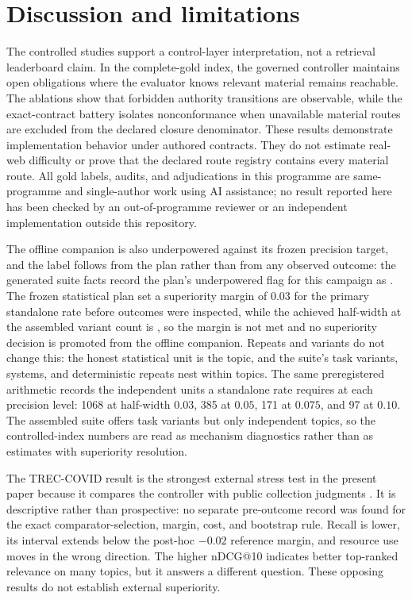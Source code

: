 \documentclass[a4paper,fleqn]{cas-sc}
\theoremstyle{definition}
\begin{document}
\section{Discussion and limitations}

The controlled studies support a control-layer interpretation, not a retrieval
leaderboard claim. In the complete-gold index, the governed controller maintains
open obligations where the evaluator knows relevant material remains reachable.
The ablations show that forbidden authority transitions are observable, while
the exact-contract battery isolates nonconformance when unavailable material
routes are excluded from the declared closure denominator. These results demonstrate implementation behavior
under authored contracts. They do not estimate real-web difficulty or prove
that the declared route registry contains every material route.  All gold labels, audits, and adjudications in this programme are same-programme and single-author work using AI assistance; no result reported here has been checked by an out-of-programme reviewer or an independent implementation outside this repository.

The offline companion is also underpowered against its frozen precision
target, and the label follows from the plan rather than from any observed
outcome: the generated suite facts record the plan's underpowered flag for this
campaign as \OfflineUnderpowered{}. The frozen statistical plan set a
superiority margin of $0.03$ for the primary standalone rate before outcomes
were inspected, while the achieved half-width at the assembled variant count is
\OfflineAchievedHalfWidth{}, so the margin is not met and no superiority
decision is promoted from the offline companion. Repeats and variants do not
change this: the honest statistical unit is the topic, and the suite's
\OfflineTaskCount{} task variants, \OfflineSystemCount{} systems, and
\OfflineRepeatCount{} deterministic repeats nest within \OfflineTopicCount{}
topics. The same preregistered arithmetic records the independent units a
standalone rate requires at each precision level: 1068 at half-width $0.03$,
385 at $0.05$, 171 at $0.075$, and 97 at $0.10$. The assembled suite offers
\OfflineTaskCount{} task variants but only \OfflineTopicCount{} independent
topics, so the controlled-index numbers are read as mechanism diagnostics
rather than as estimates with superiority resolution.

The TREC-COVID result is the strongest external stress test in the present
paper because it compares the controller with public collection judgments
\cite{voorhees2020treccovid}. It is descriptive rather than prospective: no
separate pre-outcome record was found for the exact comparator-selection,
margin, cost, and bootstrap rule. Recall is lower, its interval extends below
the post-hoc $-0.02$ reference margin, and resource use moves in the wrong
direction. The higher nDCG@10 indicates better top-ranked relevance on many
topics, but it answers a different question. These opposing results do not
establish external superiority.
\end{document}
